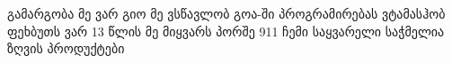 გამარგობა მე ვარ გიო მე ვსწავლობ გოა-ში პროგრამირებას ვტამასჰობ ფეხბუთს ვარ 13 წლის მე მიყვარს პორშე 911 ჩემი საყვარელი საჭმელია ზღვის პროდუქტები

